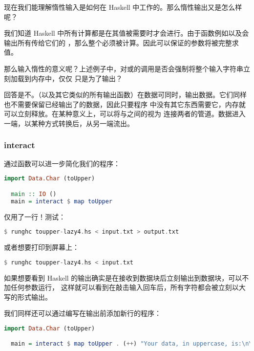 \documentclass[./main.tex]{subfiles}
\begin{document}
现在我们能理解惰性输入是如何在 Haskell 中工作的。那么惰性输出又是怎么样呢？

我们知道 Haskell 中所有计算都是在其值被需要时才会进行。由于函数例如以及会输出所有传给它们的
，那么整个必须被计算。因此可以保证的参数将被完整求值。

那么输入惰性的意义呢？上述例子中，对或的调用是否会强制将整个输入字符串立刻加载到内存中，仅仅
只是为了输出？

回答是不。（以及其它类似的所有输出函数）在数据可同时，输出数据。它们同样也不需要保留已经输出了的数据，因此只要程序
中没有其它东西需要它，内存就可以立刻释放。在某种意义上，可以将与之间的视为
连接两者的管道。数据进入一端，以某种方式转换后，从另一端流出。

\subsubsection*{interact}

通过函数可以进一步简化我们的程序：

\begin{lstlisting}[language=Haskell]
  import Data.Char (toUpper)

  main :: IO ()
  main = interact $ map toUpper
\end{lstlisting}

仅用了一行！测试：

\begin{lstlisting}[language=Haskell]
  $ runghc toupper-lazy4.hs < input.txt > output.txt
\end{lstlisting}

或者想要打印到屏幕上：

\begin{lstlisting}[language=Haskell]
  $ runghc toupper-lazy4.hs < input.txt
\end{lstlisting}

如果想要看到 Haskell 的输出确实是在接收到数据块后立刻输出到数据块，可以不加任何参数运行，
这样就可以看到在敲击输入回车后，所有字符都会被立刻以大写的形式输出。

我们同样还可以通过编写在输出前添加新行的程序：

\begin{lstlisting}[language=Haskell]
  import Data.Char (toUpper)

  main = interact $ map toUpper . (++) "Your data, in uppercase, is:\n\n"
\end{lstlisting}
\end{document}
